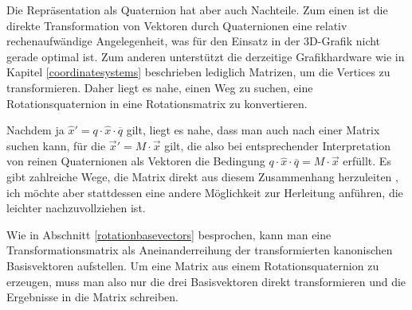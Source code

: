 Die Repräsentation als Quaternion hat aber auch Nachteile. Zum einen ist die direkte Transformation von Vektoren durch Quaternionen eine relativ rechenaufwändige Angelegenheit, was für den Einsatz in der 3D-Grafik nicht gerade optimal ist. Zum anderen unterstützt die derzeitige Grafikhardware wie in Kapitel \ref{coordinatesystems} beschrieben lediglich Matrizen, um die Vertices zu transformieren. Daher liegt es nahe, einen Weg zu suchen, eine Rotationsquaternion in eine Rotationsmatrix zu konvertieren. 

Nachdem ja $\hat{x}'= q \cdot \hat{x} \cdot \overline{q}$ gilt, liegt es nahe, dass man auch nach einer Matrix suchen kann, für die $\vec{x}' = M \cdot \vec{x}$ gilt, die also bei entsprechender Interpretation von reinen Quaternionen als Vektoren die Bedingung $q \cdot \hat{x} \cdot \overline{q} = M \cdot \vec{x}$ erfüllt. Es gibt zahlreiche Wege, die Matrix direkt aus diesem Zusammenhang herzuleiten , ich möchte aber stattdessen eine andere Möglichkeit zur Herleitung anführen, die leichter nachzuvollziehen ist.

Wie in Abschnitt \ref{rotationbasevectors} besprochen, kann man eine Transformationsmatrix als Aneinanderreihung der transformierten kanonischen Basisvektoren aufstellen. Um eine Matrix aus einem Rotationsquaternion zu erzeugen, muss man also nur die drei Basisvektoren direkt transformieren und die Ergebnisse in die Matrix schreiben.

